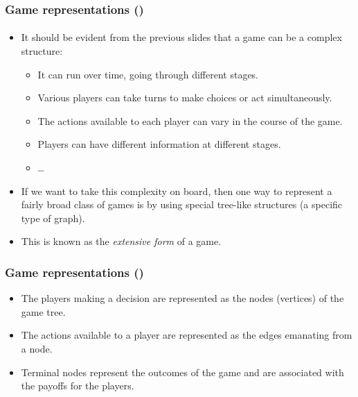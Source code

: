 \documentclass[10pt]{beamer}
\theoremstyle{definition}
\begin{document}
\setcounter{slidenum}{1}
\begin{frame}[fragile]
\frametitle{Game representations ()}
\framesubtitle{}
\begin{itemize}\itemsep1em
\item It should be evident from the previous slides that a game can be a complex structure:
	\begin{itemize}\itemsep1em
	\item It can run over time, going through different stages.
	\item Various players can take turns to make choices or act simultaneously.
	\item The actions available to each player can vary in the course of the game.
	\item Players can have different information at different stages.
	\item \ldots
	\end{itemize}
\item If we want to take this complexity on board, then one way to represent a fairly broad class of games is by using special tree-like structures (a specific type of graph).
\item This is known as the \emph{extensive form} of a game.
\end{itemize}
\end{frame}



\begin{frame}[fragile]
\frametitle{Game representations ()}
\begin{itemize}\itemsep1em
\item The players making a decision are represented as the nodes (vertices) of the game tree.
\item The actions available to a player are represented as the edges emanating from a node.
\item Terminal nodes represent the outcomes of the game and are associated with the payoffs for the players.
\end{itemize}
\end{frame}
\end{document}
